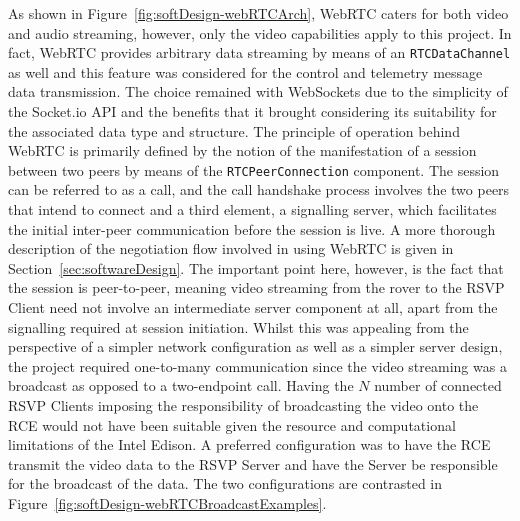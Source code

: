       As shown in Figure~\ref{fig:softDesign-webRTCArch}, WebRTC caters for both video and audio streaming, however, only the video capabilities apply to this project. In fact, WebRTC provides arbitrary data streaming by means of an \texttt{RTCDataChannel} as well and this feature was considered for the control and telemetry message data transmission. The choice remained with WebSockets due to the simplicity of the Socket.io API and the benefits that it brought considering its suitability for the associated data type and structure. The principle of operation behind WebRTC is primarily defined by the notion of the manifestation of a session between two peers by means of the \texttt{RTCPeerConnection} component. The session can be referred to as a call, and the call handshake process involves the two peers that intend to connect and a third element, a signalling server, which facilitates the initial inter-peer communication before the session is live. A more thorough description of the negotiation flow involved in using WebRTC is given in Section~\ref{sec:softwareDesign}. The important point here, however, is the fact that the session is peer-to-peer, meaning video streaming from the rover to the RSVP Client need not involve an intermediate server component at all, apart from the signalling required at session initiation. Whilst this was appealing from the perspective of a simpler network configuration as well as a simpler server design, the project required one-to-many communication since the video streaming was a broadcast as opposed to a two-endpoint call. Having the $N$ number of connected RSVP Clients imposing the responsibility of broadcasting the video onto the RCE would not have been suitable given the resource and computational limitations of the Intel Edison. A preferred configuration was to have the RCE transmit the video data to the RSVP Server and have the Server be responsible for the broadcast of the data. The two configurations are contrasted in Figure~\ref{fig:softDesign-webRTCBroadcastExamples}.
      
